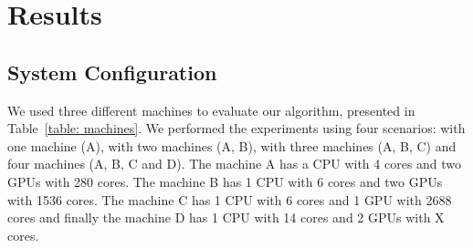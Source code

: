 \documentclass[journal]{IEEEtran}
\begin{document}

\section{Results}


\subsection{System Configuration}

We used three different machines to evaluate our algorithm, presented in Table~\ref{table: machines}. We performed the experiments using four scenarios: with one machine (A), with two machines (A, B), with three machines (A, B, C) and four machines (A, B, C and D). The machine A has a CPU with 4 cores and two GPUs with 280 cores. The machine B has 1 CPU with 6 cores and two GPUs with 1536 cores. The machine C has 1 CPU with 6 cores and 1 GPU with 2688 cores and finally the machine D has 1 CPU with 14 cores and 2 GPUs with X cores. 
\end{document}
